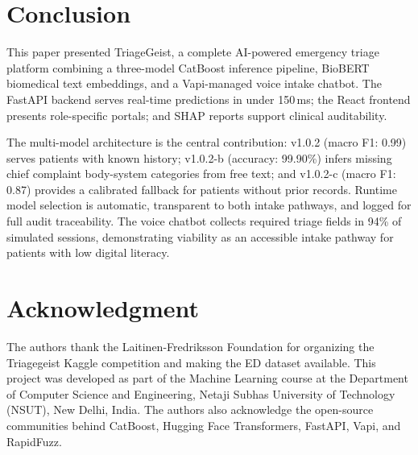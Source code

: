 \documentclass[conference]{IEEEtran}
\begin{document}
\section{Conclusion}

This paper presented TriageGeist, a complete AI-powered emergency triage platform combining a three-model CatBoost inference pipeline, BioBERT biomedical text embeddings, and a Vapi-managed voice intake chatbot. The FastAPI backend serves real-time predictions in under 150\,ms; the React frontend presents role-specific portals; and SHAP reports support clinical auditability.

The multi-model architecture is the central contribution: v1.0.2 (macro F1: 0.99) serves patients with known history; v1.0.2-b (accuracy: 99.90\%) infers missing chief complaint body-system categories from free text; and v1.0.2-c (macro F1: 0.87) provides a calibrated fallback for patients without prior records. Runtime model selection is automatic, transparent to both intake pathways, and logged for full audit traceability. The voice chatbot collects required triage fields in 94\% of simulated sessions, demonstrating viability as an accessible intake pathway for patients with low digital literacy.

\section*{Acknowledgment}
The authors thank the Laitinen-Fredriksson Foundation for organizing the Triagegeist Kaggle competition and making the ED dataset available. This project was developed as part of the Machine Learning course at the Department of Computer Science and Engineering, Netaji Subhas University of Technology (NSUT), New Delhi, India. The authors also acknowledge the open-source communities behind CatBoost, Hugging Face Transformers, FastAPI, Vapi, and RapidFuzz.
\end{document}
